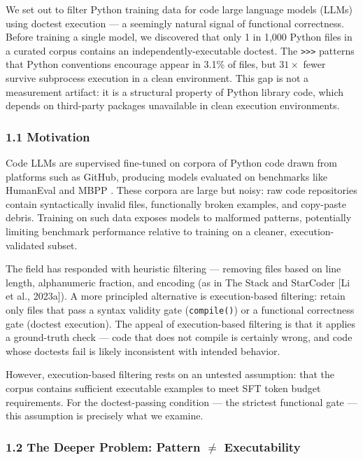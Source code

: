 
We set out to filter Python training data for code large language models (LLMs) using
doctest execution --- a seemingly natural signal of functional correctness. Before training
a single model, we discovered that only 1 in 1,000 Python files in a curated corpus
contains an independently-executable doctest. The \texttt{>>>} patterns that Python conventions
encourage appear in 3.1\% of files, but $31\times$ fewer survive subprocess execution in a clean
environment. This gap is not a measurement artifact: it is a structural property of
Python library code, which depends on third-party packages unavailable in clean execution
environments.

\subsubsection{1.1 Motivation}

Code LLMs are supervised fine-tuned on corpora of Python code drawn from platforms such
as GitHub, producing models evaluated on benchmarks like HumanEval \citep{Chen2021}
and MBPP \citep{Austin2021}. These corpora are large but noisy: raw code repositories
contain syntactically invalid files, functionally broken examples, and copy-paste debris.
Training on such data exposes models to malformed patterns, potentially limiting benchmark
performance relative to training on a cleaner, execution-validated subset.

The field has responded with heuristic filtering --- removing files based on line length,
alphanumeric fraction, and encoding (as in The Stack \citep{Kocetkov2022} and StarCoder
[Li et al., 2023a]). A more principled alternative is execution-based filtering: retain
only files that pass a syntax validity gate (\texttt{compile()}) or a functional correctness gate
(doctest execution). The appeal of execution-based filtering is that it applies a
ground-truth check --- code that does not compile is certainly wrong, and code whose doctests
fail is likely inconsistent with intended behavior.

However, execution-based filtering rests on an untested assumption: that the corpus contains
sufficient executable examples to meet SFT token budget requirements. For the doctest-passing
condition --- the strictest functional gate --- this assumption is precisely what we examine.

\subsubsection{1.2 The Deeper Problem: Pattern $\neq$ Executability}

